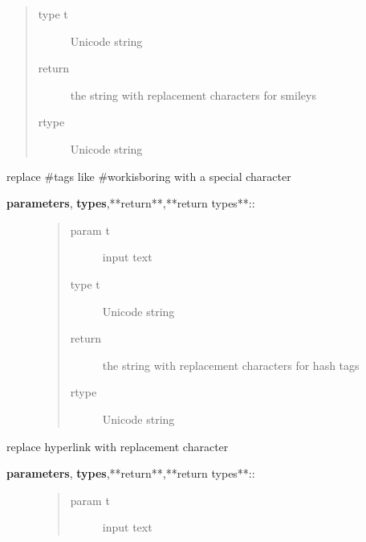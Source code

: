 \documentclass[letterpaper,10pt,english]{sphinxmanual}
\begin{document}
\begin{fulllineitems}
\begin{fulllineitems}
\begin{description}
\begin{quote}
\begin{description}
\item[{type t}] \leavevmode
Unicode string

\item[{return}] \leavevmode
the string with replacement characters for smileys

\item[{rtype}] \leavevmode
Unicode string

\end{description}\end{quote}

\end{description}

\end{fulllineitems}


\begin{fulllineitems}
\label{API:norm.prepro.rewrite.Rewrite.replace_hashtags}
replace \#tags like \#workisboring with a special character
\begin{description}
\item[{\textbf{parameters}, \textbf{types},**return**,**return types**::}] \leavevmode\begin{quote}\begin{description}
\item[{param t}] \leavevmode
input text

\item[{type t}] \leavevmode
Unicode string

\item[{return}] \leavevmode
the string with replacement characters for hash tags

\item[{rtype}] \leavevmode
Unicode string

\end{description}\end{quote}

\end{description}

\end{fulllineitems}


\begin{fulllineitems}
\label{API:norm.prepro.rewrite.Rewrite.replace_hyperlinks}
replace hyperlink with replacement character
\begin{description}
\item[{\textbf{parameters}, \textbf{types},**return**,**return types**::}] \leavevmode\begin{quote}\begin{description}
\item[{param t}] \leavevmode
input text


\end{description}
\end{quote}
\end{description}
\end{fulllineitems}
\end{fulllineitems}
\end{document}
